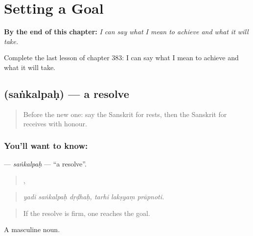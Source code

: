 
\chapter{Setting a Goal}
\label{ch:sa-setting-a-goal}

\begin{chapteropening}
\textbf{By the end of this chapter:} \emph{I can say what I mean to achieve and what it will take.}

Complete the last lesson of chapter 383: I can say what I mean to achieve and what it will take.
\end{chapteropening}

\section[\texorpdfstring{\sk{संकल्पः} (saṅkalpaḥ)}{संकल्पः (saṅkalpaḥ)}]{ (saṅkalpaḥ) — a resolve}

\label{lesson:SA-C383-sankalpah}



\begin{quote}
Before the new one: say the Sanskrit for rests, then the Sanskrit for receives with honour.
\end{quote}

\subsection*{You'll want to know: }
\textbf{} — \emph{saṅkalpaḥ} — \textquotedblleft{}a resolve\textquotedblright{}.

\begin{quote}
  ,   
\end{quote}

\begin{quote}
\emph{yadi saṅkalpaḥ dṛḍhaḥ, tarhi lakṣyaṃ prāpnoti.}
\end{quote}

\begin{quote}
If the resolve is firm, one reaches the goal.
\end{quote}

A masculine noun.

